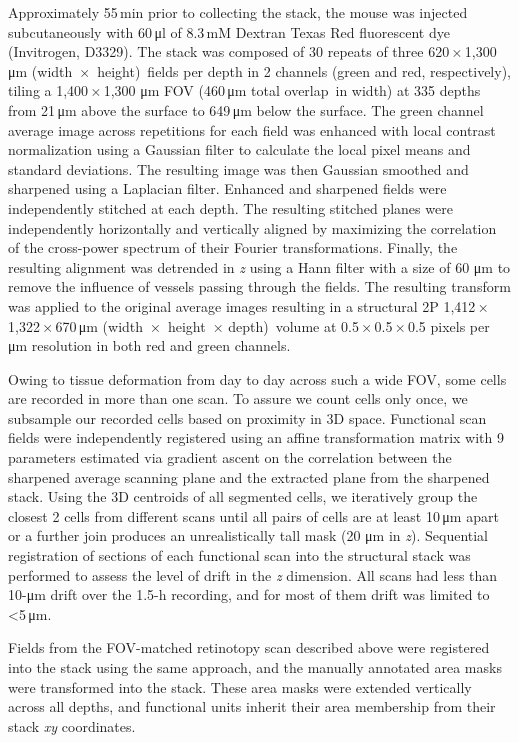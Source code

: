 \documentclass{article}
\begin{document}
Approximately 55\,min prior to collecting the stack, the mouse was injected subcutaneously with 60\,μl of 8.3\,mM Dextran Texas Red fluorescent dye (Invitrogen, D3329). The stack was composed of 30 repeats of three 620\,×\,1,300\,μm (width~×~height)~fields per depth in 2 channels (green and red, respectively), tiling a 1,400\,×\,1,300 μm FOV (460\,μm total overlap~in width) at 335 depths from 21\,μm above the surface to 649\,μm below the surface. The green channel average image across repetitions for each field was enhanced with local contrast normalization using a Gaussian filter to calculate the local pixel means and standard deviations. The resulting image was then Gaussian smoothed and sharpened using a Laplacian filter. Enhanced and sharpened fields were independently stitched at each depth. The resulting stitched planes were independently horizontally and vertically aligned by maximizing the correlation of the cross-power spectrum of their Fourier transformations. Finally, the resulting alignment was detrended in \emph{z} using a Hann filter with a size of 60 μm to remove the influence of vessels passing through the fields. The resulting transform was applied to the original average images resulting in a structural 2P 1,412\,×\,1,322\,×\,670\,μm (width~×~height~× depth)~volume at 0.5\,×\,0.5\,×\,0.5 pixels per μm resolution in both red and green channels.

Owing to tissue deformation from day to day across such a wide FOV, some cells are recorded in more than one scan. To assure we count cells only once, we subsample our recorded cells based on proximity in 3D space. Functional scan fields were independently registered using an affine transformation matrix with 9 parameters estimated via gradient ascent on the correlation between the sharpened average scanning plane and the extracted plane from the sharpened stack. Using the 3D centroids of all segmented cells, we iteratively group the closest 2 cells from different scans until all pairs of cells are at least 10\,μm apart or a further join produces an unrealistically tall mask (20 μm in \emph{z}). Sequential registration of sections of each functional scan into the structural stack was performed to assess the level of drift in the \emph{z} dimension. All scans had less than 10-μm drift over the 1.5-h recording, and for most of them drift was limited to <5\,μm.

Fields from the FOV-matched retinotopy scan described above were registered into the stack using the same approach, and the manually annotated area masks were transformed into the stack. These area masks were extended vertically across all depths, and functional units inherit their area membership from their stack \emph{xy} coordinates.
\end{document}
